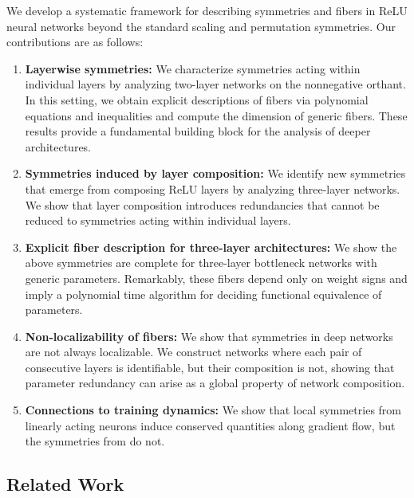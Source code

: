 \documentclass{article}
\theoremstyle{definition}
\begin{document}
We develop a systematic framework for describing symmetries and fibers in ReLU neural networks beyond the standard scaling and permutation symmetries. 
Our contributions are as follows: 
%
\begin{enumerate}[leftmargin=*, itemsep=.3pt, topsep=.3pt]
    \item \textbf{Layerwise symmetries:} 
    We characterize symmetries acting within individual layers by analyzing two-layer networks on the nonnegative orthant. 
    In this setting, we obtain explicit descriptions of fibers via polynomial equations and inequalities and compute the dimension of generic fibers. 
    These results provide a fundamental building block for the analysis of deeper architectures. 
    
    \item \textbf{Symmetries induced by layer composition:} 
    We identify new symmetries that emerge from composing ReLU layers by analyzing three-layer networks. We show that layer composition introduces redundancies that cannot be reduced to symmetries acting within individual layers. 

    \item \textbf{Explicit fiber description for three-layer architectures:} 
    We show the above symmetries are complete for three-layer bottleneck networks with generic parameters. 
    Remarkably, these fibers depend only on weight signs 
    and imply a polynomial time algorithm for deciding functional equivalence of parameters. 

    \item \textbf{Non-localizability of fibers:} 
    We show that symmetries in deep networks are not always localizable. We construct networks where each pair of consecutive layers is identifiable, but their composition is not, showing that parameter redundancy can arise as a global property of network composition. 

    \item \textbf{Connections to training dynamics:} 
    We show that local symmetries from linearly acting neurons induce conserved quantities along gradient flow, but the symmetries from  do not.  
\end{enumerate}


\subsection{Related Work}
\end{document}
